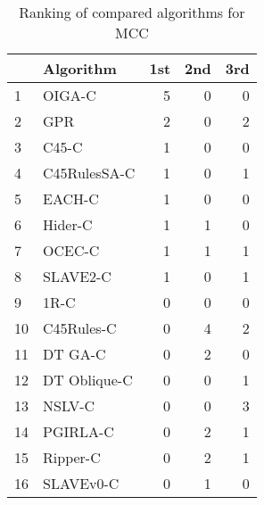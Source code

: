 \begin{table}
\footnotesize
\caption{Ranking of compared algorithms for MCC}
\label{tab:places MCC}
\begin{tabular}{llrrr}
\hline
 & Algorithm & 1st & 2nd & 3rd \\
\hline
1 & OIGA-C & 5 & 0 & 0 \\
2 & GPR & 2 & 0 & 2 \\
3 & C45-C & 1 & 0 & 0 \\
4 & C45RulesSA-C & 1 & 0 & 1 \\
5 & EACH-C & 1 & 0 & 0 \\
6 & Hider-C & 1 & 1 & 0 \\
7 & OCEC-C & 1 & 1 & 1 \\
8 & SLAVE2-C & 1 & 0 & 1 \\
9 & 1R-C & 0 & 0 & 0 \\
10 & C45Rules-C & 0 & 4 & 2 \\
11 & DT GA-C & 0 & 2 & 0 \\
12 & DT Oblique-C & 0 & 0 & 1 \\
13 & NSLV-C & 0 & 0 & 3 \\
14 & PGIRLA-C & 0 & 2 & 1 \\
15 & Ripper-C & 0 & 2 & 1 \\
16 & SLAVEv0-C & 0 & 1 & 0 \\
\hline
\end{tabular}
\end{table}
